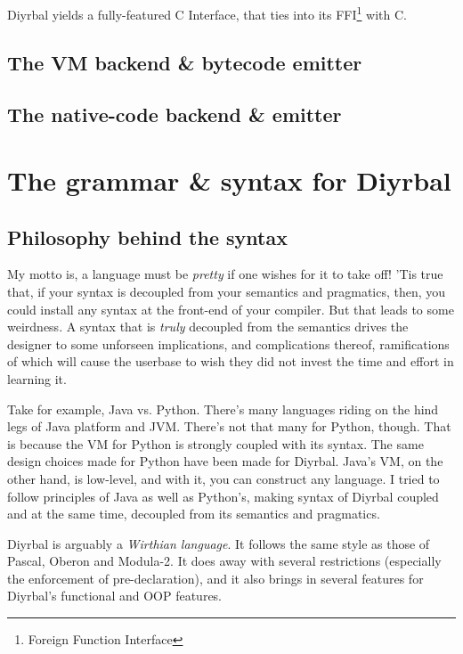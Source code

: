 \documentclass[a4paper,12pt]{article}
\newcommand{\nm}{Diyrbal\xspace}
\begin{document}
\nm yields a fully-featured C Interface, that ties into its FFI\footnote{Foreign Function Interface} with C.

\subsection{The VM backend \& bytecode emitter}


\subsection{The native-code backend \& emitter}




\section{The grammar \& syntax for \nm}

\subsection{Philosophy behind the syntax}

My motto is, a language must be \textit{pretty} if one wishes for it to take off! 'Tis true that, if your syntax is decoupled from your semantics and pragmatics, then, you could install any syntax at the front-end of your compiler. But that leads to some weirdness. A syntax that is \textit{truly} decoupled from the semantics drives the designer to some unforseen implications, and complications thereof, ramifications of which will cause the userbase to wish they did not invest the time and effort in learning it.

Take for example, Java vs. Python. There's many languages riding on the hind legs of Java platform and JVM. There's not that many for Python, though. That is because the VM for Python is strongly coupled with its syntax. The same design choices made for Python have been made for \nm. Java's VM, on the other hand, is low-level, and with it, you can construct any language. I tried to follow principles of Java as well as Python's, making syntax of \nm coupled and at the same time, decoupled from its semantics and pragmatics.

\nm is arguably a \textit{Wirthian language}. It follows the same style as those of Pascal, Oberon and Modula-2. It does away with several restrictions (especially the enforcement of pre-declaration), and it also brings in several features for \nm's functional and OOP features.
\end{document}
